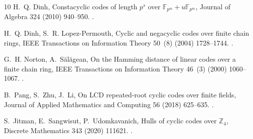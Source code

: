 \documentclass[preprint,12pt,a4paper]{elsarticle}
\theoremstyle{definition}
\theoremstyle{remark}
\begin{document}
\begin{thebibliography}{10}
H.~Q. Dinh, Constacyclic codes of length {$p^s$} over
  {$\mathbb{F}_{p^m}+u\mathbb{F}_{p^m}$}, Journal of Algebra 324 (2010)
  940--950.
\newblock \href {https://doi.org/10.1016/j.jalgebra.2010.05.027}
  {}.

H.~Q. Dinh, S.~R. Lopez-Permouth, Cyclic and negacyclic codes over finite chain
  rings, IEEE Transactions on Information Theory 50~(8) (2004) 1728--1744.
\newblock \href {https://doi.org/10.1109/TIT.2004.831789}
  {}.

G.~H. Norton, A.~S{\u{a}}l{\u{a}}gean, On the {H}amming distance of linear
  codes over a finite chain ring, IEEE Transactions on Information Theory
  46~(3) (2000) 1060--1067.
\newblock \href {https://doi.org/10.1109/18.841186}
  {}.

B.~Pang, S.~Zhu, J.~Li, On {LCD} repeated-root cyclic codes over finite fields,
  Journal of Applied Mathematics and Computing 56 (2018) 625--635.
\newblock \href {https://doi.org/10.1007/s12190-017-1118-z}
  {}.

S.~Jitman, E.~Sangwisut, P.~Udomkavanich, Hulls of cyclic codes over
  {$\mathbb{Z}_4$}, Discrete Mathematics 343 (2020) 111621.
\newblock \href {https://doi.org/10.1016/j.disc.2019.111621}
  {}.

\end{thebibliography}
\end{document}
